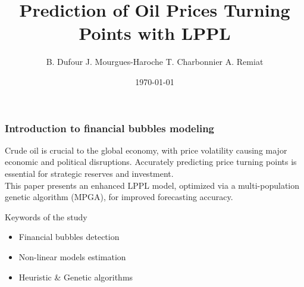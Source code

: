 \documentclass{beamer}
\title{Prediction of Oil Prices Turning Points with LPPL}
\author{B. Dufour J. Mourgues-Haroche T. Charbonnier A. Remiat}
\date{\today}
\begin{document}
\frame{\titlepage}


\begin{frame}
\frametitle{Introduction to financial bubbles modeling}
    Crude oil is crucial to the global economy, with price volatility causing major economic and political disruptions. Accurately predicting price turning points is essential for strategic reserves and investment. \\
    This paper presents an enhanced LPPL model, optimized via a multi-population genetic algorithm (MPGA), for improved forecasting accuracy.
    \begin{block}{Keywords of the study}
        \begin{itemize}
            \item {Financial bubbles detection}
            \item {Non-linear models estimation}
            \item {Heuristic \& Genetic algorithms}
        \end{itemize}
    \end{block}
\end{frame}



\end{document}
